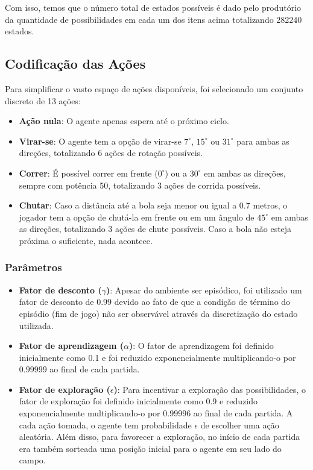 Com isso, temos que o número total de estados possíveis é dado pelo produtório da quantidade de possibilidades em cada um dos itens acima totalizando 282240 estados.

\subsection{Codificação das Ações}

Para simplificar o vasto espaço de ações disponíveis, foi selecionado um conjunto discreto de 13 ações:

\begin{itemize}
	\item \textbf{Ação nula}: O agente apenas espera até o próximo ciclo.
	
	\item \textbf{Virar-se}: O agente tem a opção de virar-se $7^{\circ}$, $15^{\circ}$ ou $31^{\circ}$ para ambas as direções, totalizando 6 ações de rotação possíveis. 
	
	\item \textbf{Correr}: É possível correr em frente ($0^{\circ}$) ou a $30^{\circ}$ em ambas as direções, sempre com potência 50, totalizando 3 ações de corrida possíveis.
	
	\item \textbf{Chutar}: Caso a distância até a bola seja menor ou igual a 0.7 metros, o jogador tem a opção de chutá-la em frente ou em um ângulo de $45^{\circ}$ em ambas as direções, totalizando 3 ações de chute possíveis. Caso a bola não esteja próxima o suficiente, nada acontece.
\end{itemize}

\subsubsection{Parâmetros}
\label{subsubsec:tabular-params}

\begin{itemize}
	\item \textbf{Fator de desconto ($\gamma$)}: Apesar do ambiente ser episódico, foi utilizado um fator de desconto de 0.99 devido ao fato de que a condição de término do episódio (fim de jogo) não ser observável através da discretização do estado utilizada.  
	
	\item \textbf{Fator de aprendizagem ($\alpha$)}: O fator de aprendizagem foi definido inicialmente como 0.1 e foi reduzido exponencialmente multiplicando-o por $0.99999$ ao final de cada partida. 
	
	\item \textbf{Fator de exploração ($\epsilon$)}: Para incentivar a exploração das possibilidades, o fator de exploração foi definido inicialmente como 0.9 e reduzido exponencialmente multiplicando-o por $0.99996$ ao final de cada partida. A cada ação tomada, o agente tem probabilidade $\epsilon$ de escolher uma ação aleatória. Além disso, para favorecer a exploração, no início de cada partida era também sorteada uma posição inicial para o agente em seu lado do campo.
\end{itemize}

